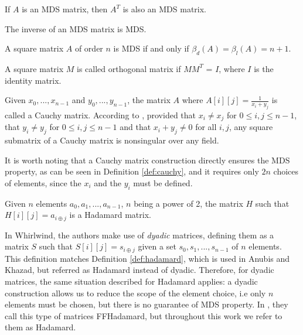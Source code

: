 \begin{corollary}
If $A$ is an MDS matrix, then $A^T$ is also an MDS matrix.
\end{corollary}

\begin{corollary}
The inverse of an MDS matrix is MDS.
\end{corollary}

\begin{fact}{\cite{RecursiveMDS2017}}
A square matrix $A$ of order $n$ is MDS if and only if $\beta_d(A) = \beta_l(A) = n+1$.
\end{fact}

\begin{definition}{\cite{RecursiveMDS2017}}
A square matrix $M$ is called orthogonal matrix if $MM^T$ = $I$, where $I$ is the identity matrix.
\end{definition}

\begin{definition}\label{def:cauchy}
Given $x_0, ..., x_{n-1}$ and $y_0, ..., y_{n-1}$, the matrix $A$ where $A[i][j] = \frac{1}{x_i + y_j}$ is called a Cauchy matrix. According to \cite{Youssef1997}, provided that $x_i \neq x_j$ for $0\leq i,j\leq n-1$, that $y_i \neq y_j$ for $0\leq i,j\leq n-1$ and that $x_i + y_j \neq 0$ for all $i, j$, any square submatrix of a Cauchy matrix is nonsingular over any field.
\end{definition}

It is worth noting that a Cauchy matrix construction directly ensures the MDS property, as can be seen in Definition \ref{def:cauchy}, and it requires only $2n$ choices of elements, since the $x_i$ and the $y_i$ must be defined.

\begin{definition}\label{def:hadamard}
Given $n$ elements $a_0, a_1, ..., a_{n-1}$, $n$ being a power of 2, the matrix $H$ such that $H[i][j] = a_{i \oplus j}$ is a Hadamard matrix.
\end{definition}

In Whirlwind\cite{Whirlwind2010}, the authors make use of \emph{dyadic} matrices, defining them as a matrix $S$ such that $S[i][j] = s_{i\oplus j}$ given a set $s_0, s_1, ... , s_{n-1}$ of $n$ elements. This definition matches Definition \ref{def:hadamard}, which is used in Anubis and Khazad, but referred as Hadamard instead of dyadic. Therefore, for dyadic matrices, the same situation described for Hadamard applies: a dyadic construction allows us to reduce the scope of the element choice, i.e only $n$ elements must be chosen, but there is no guarantee of MDS property. In \cite{Gupta2013OnCO}, they call this type of matrices FFHadamard, but throughout this work we refer to them as Hadamard.

